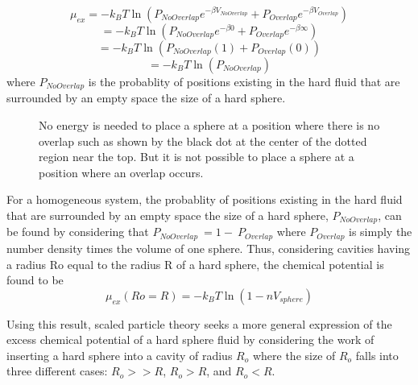 \documentclass[12pt]{article}
\begin{document}
\begin{equation}\mu_{ex}=-k_BT\ln\left(P_{NoOverlap}e^{-\beta{V}_{NoOverlap}}+P_{Overlap}e^{-\beta{V}_{Overlap}}\right)\end{equation}
\begin{equation}=-k_BT\ln\left(P_{NoOverlap}e^{-\beta{0}}+P_{Overlap}e^{-\beta\infty}\right)\end{equation}
\begin{equation}=-k_BT\ln\left(P_{NoOverlap}(1)+P_{Overlap}(0)\right)\end{equation}
\begin{equation}=-k_BT\ln\left(P_{NoOverlap}\right)\end{equation}
where $P_{NoOverlap}$ is the probablity of positions existing in the hard fluid that are surrounded by an empty space the size of a hard sphere.

\begin{figure}[h!]
    \centering
    \caption{No energy is needed to place a sphere at a position where there is no overlap such 
             as shown by the black dot at the center of the dotted region near the top. 
             But it is not possible to place a sphere at a position where an overlap occurs.}
    \label{fig:p_overlap}
  \end{figure}

For a homogeneous system, the probablity of positions existing in the hard fluid that are surrounded 
by an empty space the size of a hard sphere, $P_{NoOverlap}$, can be found by considering 
that $P_{NoOverlap}~=1-~P_{Overlap}$ where $P_{Overlap}$ is simply the number density times the volume of one sphere. 
\color{red}Thus, considering cavities having a radius Ro equal to the radius R of a hard sphere, the chemical potential is found to be \color{black}
\begin{equation}\mu_{ex}(Ro=R)=-k_BT\ln\left(1-nV_{sphere}\right)\end{equation}


Using this result, scaled particle theory seeks a more general expression of the excess chemical potential of 
a hard sphere fluid by considering the work of inserting a hard sphere into a cavity of radius $R_o$ 
where the size of $R_o$ falls into three different cases: $R_o >> R$, $R_o > R$, and $R_o < R$. 
\end{document}
